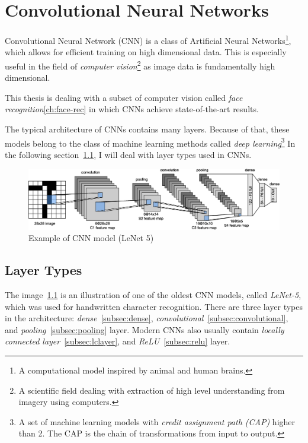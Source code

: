 \chapter{Convolutional Neural Networks}\label{ch:cnn}
Convolutional Neural Network (CNN) is a class of Artificial Neural Networks\footnote{A computational model inspired by
animal and human brains.}, which allows for efficient training on high dimensional data.
This is especially useful in the field of \textit{computer vision}\footnote{A scientific field dealing with extraction
of high level understanding from imagery using computers.} as image data is fundamentally high dimensional.

This thesis is dealing with a subset of computer vision called \textit{face recognition}\ref{ch:face-rec} in which CNNs
achieve state-of-the-art results.

The typical architecture of CNNs contains many layers.
Because of that, these models belong to the class of machine learning methods called
\textit{deep learning}\footnote{A set of machine learning models with \textit{credit assignment path (CAP)} higher than 2.
The CAP is the chain of transformations from input to output.}
In the following section~\ref{sec:layer-types}, I will deal with layer types used in CNNs.

\begin{figure}[H]
    \centering
    \includegraphics[width=\columnwidth]{images/cnn/lenet.eps}
    \caption{Example of CNN model (LeNet 5)~\cite{LeNet5}}
    \label{fig:cnn}
\end{figure}

\section{Layer Types}\label{sec:layer-types}
The image~\ref{fig:cnn} is an illustration of one of the oldest CNN models, called \textit{LeNet-5}, which was used for
handwritten character recognition.
There are three layer types in the architecture: \textit{dense}~\ref{subsec:dense},
\textit{convolutional}~\ref{subsec:convolutional}, and \textit{pooling}~\ref{subsec:pooling} layer.
Modern CNNs also usually contain \textit{locally connected layer}~\ref{subsec:lclayer}, and
\textit{ReLU}~\ref{subsec:relu} layer.

